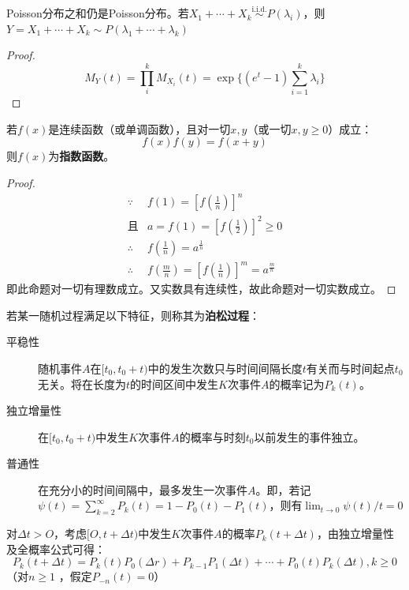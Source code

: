 \begin{proposition}
    Poisson分布之和仍是Poisson分布。若$X_1+\cdots+X_k \overset{\text{i.i.d.}}{\sim} P(\lambda_i)$，则$Y=X_1+\cdots+X_k  \sim P(\lambda_1+\cdots+\lambda_k)$
\end{proposition}
\begin{proof}
    \[ M_Y(t)=\prod_i^k M_{X_i}(t)=\exp \{(e^t-1)\sum_{i=1}^k \lambda_i\} \]
\end{proof}

\begin{lemma}\label{lem:Cauchy_lemma}
    若$f(x)$是连续函数（或单调函数），且对一切$x,y$（或一切$x,y\ge 0$）成立：
    \[ f(x)f(y)=f(x+y) \]
    则$f(x)$为\textbf{指数函数}。
\end{lemma}

\begin{proof}
    \begin{align*}
        \because   & f(1)=[f(\frac{1}{n})]^n                           \\
        \text{且}  & a=f(1)=[f(\frac{1}{2})]^2\ge 0                    \\
        \therefore & f(\frac{1}{n})=a^{\frac{1}{n}}                    \\
        \therefore & f(\frac{m}{n})=[f(\frac{1}{n})]^m=a^{\frac{m}{n}}
    \end{align*}
    即此命题对一切有理数成立。又实数具有连续性，故此命题对一切实数成立。
\end{proof}

\begin{definition}[泊松过程]
    若某一随机过程满足以下特征，则称其为\textbf{泊松过程}：
    \begin{description}
        \item[平稳性] 随机事件$A$在$[t_0, t_0 + t)$中的发生次数只与时间间隔长度$t$有关而与时间起点$t_0$无关。将在长度为$t$的时间区间中发生$K$次事件$A$的概率记为$P_k(t)$。
        \item[独立增量性] 在$[t_0, t_0 + t)$中发生$K$次事件$A$的概率与时刻$t_0$以前发生的事件独立。
        \item[普通性] 在充分小的时间间隔中，最多发生一次事件$A$。即，若记$\psi(t)=\sum_{k=2}^{\infty}P_k(t)=1-P_0(t)-P_1(t)$，则有$\lim_{t \to 0}\psi(t)/t=0$
    \end{description}
\end{definition}

对$\Delta t>O$，考虑$[O,t+\Delta t)$中发生$K$次事件$A$的概率$P_k(t+\Delta t)$，由独立增量性及全概率公式可得：
\[ P_k(t+\Delta t)=P_k(t)P_0(\Delta r) + P_{k-1}P_1(\Delta t)+ \cdots +P_0(t)P_k(\Delta t) ,k\ge 0\]
（对$n\ge 1$ ，假定$P_{-n}(t)=0$）

